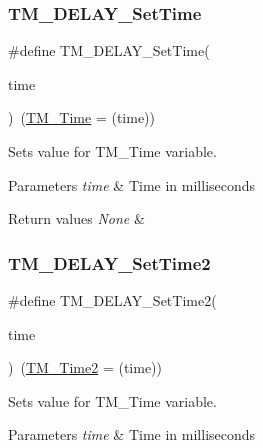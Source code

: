 \subsubsection{\texorpdfstring{T\+M\+\_\+\+D\+E\+L\+A\+Y\+\_\+\+Set\+Time}{TM\_DELAY\_SetTime}}
{\footnotesize\ttfamily \#define T\+M\+\_\+\+D\+E\+L\+A\+Y\+\_\+\+Set\+Time(\begin{DoxyParamCaption}\item[{}]{time }\end{DoxyParamCaption})~(\hyperlink{group___t_m___d_e_l_a_y___variables_ga7c995255b1d6e58256f1b6e1db969000}{T\+M\+\_\+\+Time} = (time))}



Sets value for T\+M\+\_\+\+Time variable. 


\begin{DoxyParams}{Parameters}
{\em time} & Time in milliseconds \\
\hline
\end{DoxyParams}

\begin{DoxyRetVals}{Return values}
{\em None} & \\
\hline
\end{DoxyRetVals}
\mbox{\label{group___t_m___d_e_l_a_y___functions_ga6b725c20fcbea9c3f3e549d86434d030}} 
\subsubsection{\texorpdfstring{T\+M\+\_\+\+D\+E\+L\+A\+Y\+\_\+\+Set\+Time2}{TM\_DELAY\_SetTime2}}
{\footnotesize\ttfamily \#define T\+M\+\_\+\+D\+E\+L\+A\+Y\+\_\+\+Set\+Time2(\begin{DoxyParamCaption}\item[{}]{time }\end{DoxyParamCaption})~(\hyperlink{group___t_m___d_e_l_a_y___variables_ga7a35a6c16b0617fdea660d351139ecc7}{T\+M\+\_\+\+Time2} = (time))}



Sets value for T\+M\+\_\+\+Time variable. 


\begin{DoxyParams}{Parameters}
{\em time} & Time in milliseconds \\
\hline
\end{DoxyParams}

